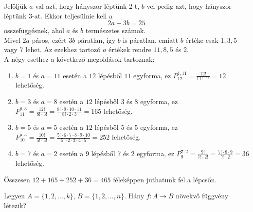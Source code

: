 \begin{solution}
Jelöljük $a$-val azt, hogy hányszor léptünk $2$-t, $b$-vel pedig
azt, hogy hányszor léptünk $3$-at. Ekkor teljesülnie kell a 
\[
2a+3b=25
\]
összefüggésnek, ahol $a$ és $b$ természetes számok.\\

Mivel $2a$ páros, ezért $3b$ páratlan, így $b$ is páratlan, emiatt
$b$ értéke csak $1,3,5$ vagy $7$ lehet. Az ezekhez tartozó $a$
értékek rendre $11,8,5$ és $2$.\\

A négy esethez a következő megoldások tartoznak: 
\begin{enumerate}
\item $b=1$ és $a=11$ esetén a $12$ lépésből $11$ egyforma, ez $P_{12}^{1,11}=\frac{12!}{11!\cdot1!}=12$
lehetőség. 
\item $b=3$ és $a=8$ esetén a $12$ lépésből $3$ és $8$ egyforma, ez
$P_{11}^{8,3}=\frac{12!}{8!\cdot3!}=\frac{8!\cdot9\cdot10\cdot11}{8!\cdot2\cdot3}=165$
lehetőség. 
\item $b=5$ és $a=5$ esetén a $12$ lépésből $5$ és $5$ egyforma, ez
$P_{10}^{5,5}=\frac{10!}{5!\cdot5!}=\frac{5!\cdot6\cdot7\cdot8\cdot9\cdot10}{5!\cdot2\cdot3\cdot4\cdot5}=252$
lehetőség. 
\item $b=7$ és $a=2$ esetén a $9$ lépésből $7$ és $2$ egyforma, ez
$P_{9}^{7,2}=\frac{9!}{7!\cdot2!}=\frac{7!\cdot8\cdot9}{7!\cdot2}=36$
lehetőség. 
\end{enumerate}
Összesen $12+165+252+36=465$ féleképpen juthatunk fel a lépcsőn. 
\end{solution}
\begin{extraproblem}
Legyen $A=\{1,2,\dots,k\}$, $B=\{1,2,\dots,n\}$. Hány $f:A\to B$
növekvő függvény létezik?
\end{extraproblem}

